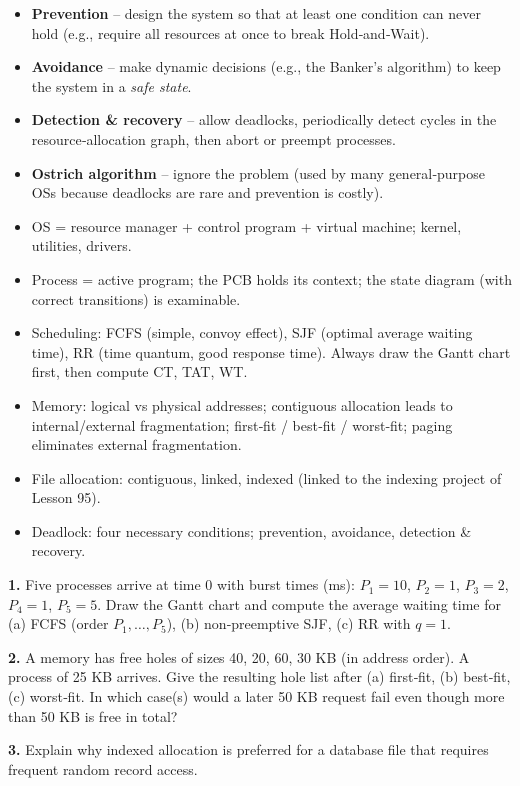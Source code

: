 \documentclass[11pt]{article}
\newcounter{popsec}
\newcounter{popsub}
\newcommand{\courssub}[1]{%
  \stepcounter{popsub}%
  \par\vspace{9pt}\noindent{\popxbold\fontsize{11.5}{13}\selectfont\color{popink}{\color{poporange}\thepopsec.\thepopsub}\hspace{6pt}#1}\par\nopagebreak\vspace{4pt}
}
\begin{document}
\begin{aretenir}
\begin{itemize}
  \item \textbf{Prevention} – design the system so that at least one condition can never hold (e.g., require all resources at once to break Hold‑and‑Wait).
  \item \textbf{Avoidance} – make dynamic decisions (e.g., the Banker's algorithm) to keep the system in a \emph{safe state}.
  \item \textbf{Detection \& recovery} – allow deadlocks, periodically detect cycles in the resource‑allocation graph, then abort or preempt processes.
  \item \textbf{Ostrich algorithm} – ignore the problem (used by many general‑purpose OSs because deadlocks are rare and prevention is costly).
\end{itemize}
\end{aretenir}

\courssub{Summary and Key Points}

\begin{aretenir}
\begin{itemize}
  \item OS = resource manager + control program + virtual machine; kernel, utilities, drivers.
  \item Process = active program; the PCB holds its context; the state diagram (with correct transitions) is examinable.
  \item Scheduling: FCFS (simple, convoy effect), SJF (optimal average waiting time), RR (time quantum, good response time).  Always draw the Gantt chart first, then compute CT, TAT, WT.
  \item Memory: logical vs physical addresses; contiguous allocation leads to internal/external fragmentation; first‑fit / best‑fit / worst‑fit; paging eliminates external fragmentation.
  \item File allocation: contiguous, linked, indexed (linked to the indexing project of Lesson 95).
  \item Deadlock: four necessary conditions; prevention, avoidance, detection \& recovery.
\end{itemize}
\end{aretenir}

\begin{exercice}
\textbf{1.} Five processes arrive at time 0 with burst times (ms): $P_1=10$, $P_2=1$, $P_3=2$, $P_4=1$, $P_5=5$.  Draw the Gantt chart and compute the average waiting time for (a) FCFS (order $P_1,\dots,P_5$), (b) non‑preemptive SJF, (c) RR with $q=1$.\par
\textbf{2.} A memory has free holes of sizes 40, 20, 60, 30 KB (in address order).  A process of 25 KB arrives.  Give the resulting hole list after (a) first‑fit, (b) best‑fit, (c) worst‑fit.  In which case(s) would a later 50 KB request fail even though more than 50 KB is free in total?\par
\textbf{3.} Explain why indexed allocation is preferred for a database file that requires frequent random record access.
\end{exercice}
\end{document}
